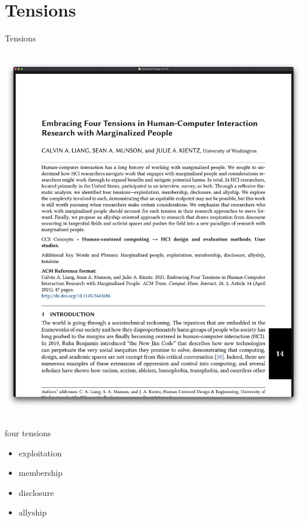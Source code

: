 \documentclass[aspectratio=169,17pt]{beamer} %
\begin{document}
\section{Tensions}

\begin{frame}{Tensions}

\begin{columns}
\begin{column}{0.7\textwidth}
\includegraphics[width=\textwidth]{figures/papers/tensions.png}
\end{column}

\end{columns}

\end{frame}

\begin{frame}{four tensions}
    
{\large\scshape\begin{itemize}
\item exploitation
\item membership
\item disclosure
\item allyship
\end{itemize}}

\end{frame}
\end{document}
